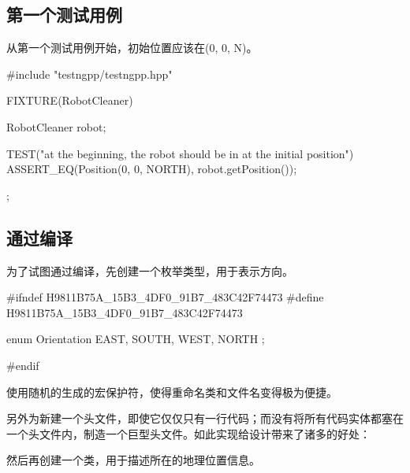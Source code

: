 \begin{content}

\subsection{第一个测试用例}

从第一个测试用例开始，初始位置应该在{(0, 0, N)}。

\begin{leftbar}
\begin{c++}[caption={test/robot-cleaner/TestRobotCleaner.h}]
#include "testngpp/testngpp.hpp"

FIXTURE(RobotCleaner)
{
    RobotCleaner robot;

    TEST("at the beginning, the robot should be in at the initial position")
    {
        ASSERT_EQ(Position(0, 0, NORTH), robot.getPosition());
    }
};
\end{c++}
\end{leftbar}

\subsection{通过编译}

为了试图通过编译，先创建一个枚举类型，用于表示方向。

\begin{leftbar}
\begin{c++}[caption={include/robot-cleaner/Orientation.h}]
#ifndef H9811B75A_15B3_4DF0_91B7_483C42F74473
#define H9811B75A_15B3_4DF0_91B7_483C42F74473

enum Orientation { EAST, SOUTH, WEST, NORTH };

#endif
\end{c++}
\end{leftbar}

使用随机的生成的宏保护符，使得重命名类和文件名变得极为便捷。

另外为新建一个头文件，即使它仅仅只有一行代码；而没有将所有代码实体都塞在一个头文件内，制造一个巨型头文件。如此实现给设计带来了诸多的好处：
\begin{enum}
\end{enum}

然后再创建一个类，用于描述所在的地理位置信息。


\end{content}
